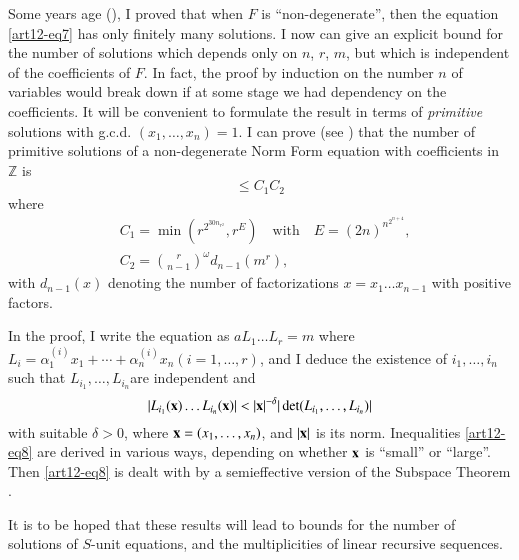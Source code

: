 Some years age (\cite{art12-key10}), I proved that when $F$ is ``non-degenerate'', then the equation \eqref{art12-eq7} has only finitely many solutions. I now can give an explicit bound for the number of solutions which depends only on $n$, $r$, $m$, but which is independent of the coefficients of $F$. In fact, the proof by induction on the number $n$ of variables would break down if at some stage we had dependency on the coefficients. It will be convenient to formulate the result in terms of {\em primitive} solutions with g.c.d. $(x_{1},\ldots,x_{n})=1$. I can prove (see \cite{art12-key13}) that the number of primitive solutions of a non-degenerate Norm Form equation with coefficients in $\mathbb{Z}$ is
$$
\leq C_{1}C_{2}
$$
where
\begin{align*}
& C_{1}=\min (r^{2^{30n_{r^{2}}}},r^{E})\text{~~ with~~ } E=(2n)^{n^{2^{n+4}}},\\
& C_{2}=\binom{r}{n-1}^{\omega}d_{n-1}(m^{r}),
\end{align*}
with $d_{n-1}(x)$ denoting the number of factorizations $x=x_{1}\ldots x_{n-1}$ with positive factors.

In the proof, I write the equation as $aL_{1}\ldots L_{r}=m$ where $L_{i}=\alpha^{(i)}_{1}x_{1}+\cdots+\alpha^{(i)}_{n}x_{n}(i=1,\ldots,r)$, and I deduce the existence of $i_{1},\ldots,i_{n}$ such that $L_{i_{1}},\ldots,L_{i_{n}}$\pageoriginale are independent and
\begin{equation}
|L_{i_{1}}(\bx)\ldots L_{i_{n}}(\bx)|<|\bx|^{-\delta}|\det (L_{i_{1}},\ldots,L_{i_{n}})|\label{art12-eq8}
\end{equation}
with suitable $\delta>0$, where $\mathbf{x}=(x_{1},\ldots,x_{n})$, and $|\mathbf{x}|$ is its norm. Inequalities \eqref{art12-eq8} are derived in various ways, depending on whether $\mathbf{x}$ is ``small'' or ``large''. Then \eqref{art12-eq8} is dealt with by a semieffective version of the Subspace Theorem \cite{art12-key11}.

It is to be hoped that these results will lead to bounds for the number of solutions of $S$-unit equations, and the multiplicities of linear recursive sequences.

